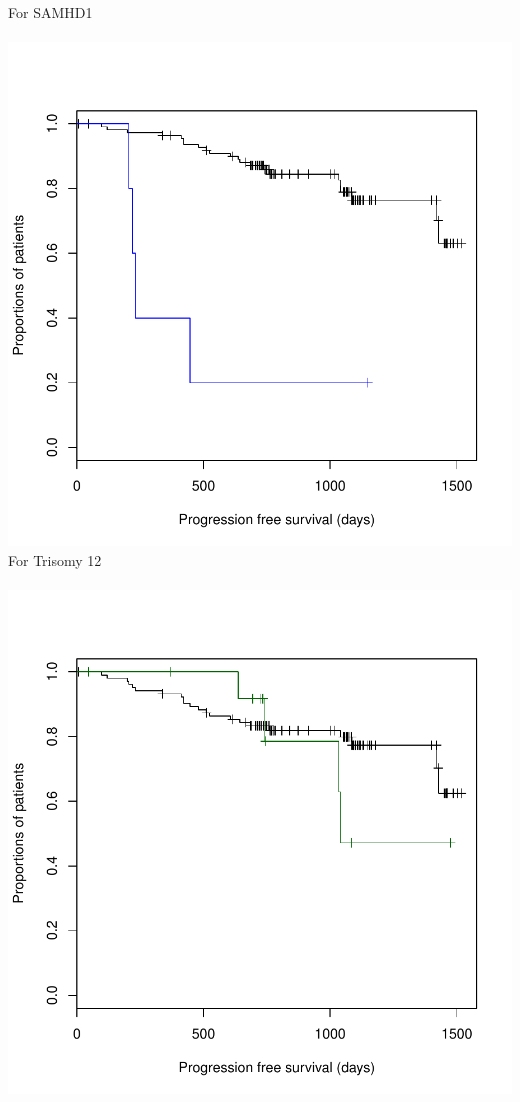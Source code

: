 \documentclass[a4paper,11pt]{article}
\begin{document}
\newpage
For SAMHD1\\\
\\
\includegraphics{HICF1_Finalreportv6-037}
\newpage
For Trisomy 12\\\
\\
\includegraphics{HICF1_Finalreportv6-039}
\end{document}
